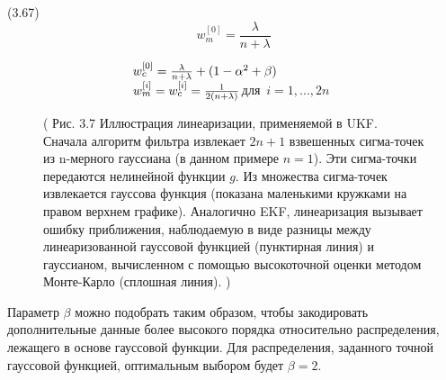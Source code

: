 \documentclass[10pt,a4paper]{article}
\begin{document}
(3.67)
$$w_m^{[0]}=\frac{\lambda}{n+\lambda}$$

$\hspace{35mm}w_c^{[0]}=\frac{\lambda}{n+\lambda}+(1-\alpha^2+\beta)$\\

$\hspace{35mm}w_m^{[i]}=w_c^{[i]}=\frac{1}{2(n+\lambda)}$\qquad\mbox {для $i=1,...,2n$}\\

\begin{figure}[H]
	\caption{ (  Рис. 3.7 Иллюстрация линеаризации, применяемой в UKF. Сначала алгоритм фильтра  извлекает $2n + 1$ взвешенных сигма-точек из n-мерного гауссиана (в данном примере $n = 1$). Эти сигма-точки передаются нелинейной функции $g$. Из множества сигма-точек извлекается гауссова функция (показана маленькими кружками на правом верхнем графике). Аналогично EKF, линеаризация вызывает ошибку приближения, наблюдаемую в виде разницы между линеаризованной гауссовой функцией (пунктирная линия) и гауссианом, вычисленном с помощью высокоточной оценки методом Монте-Карло (сплошная линия). )}
	\label{fig:37orig}
\end{figure}

Параметр $\beta$ можно подобрать таким образом, чтобы закодировать дополнительные  данные более высокого порядка относительно распределения, лежащего в основе гауссовой функции. Для распределения, заданного точной гауссовой функцией, оптимальным выбором будет $\beta = 2$.
\end{document}
